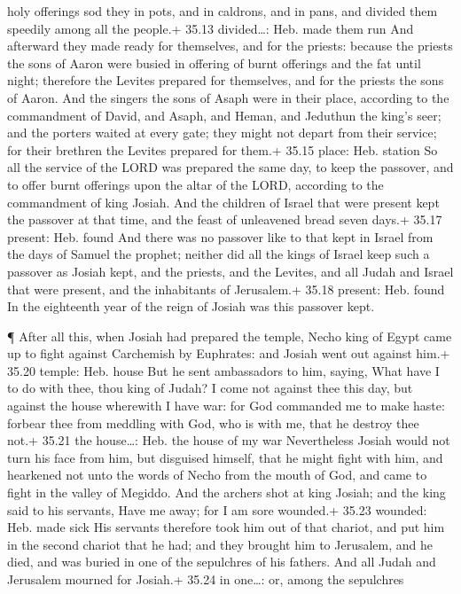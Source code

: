 holy offerings sod they in pots, and in caldrons, and in pans, and
divided them speedily among all the people.+ 35.13 divided\ldots: Heb.
made them run  And afterward they made ready for
themselves, and for the priests: because the priests the sons of Aaron
were busied in offering of burnt offerings and the fat until night;
therefore the Levites prepared for themselves, and for the priests the
sons of Aaron.  And the singers the sons of Asaph were in
their place, according to the commandment of David, and Asaph, and
Heman, and Jeduthun the king's seer; and the porters waited at every
gate; they might not depart from their service; for their brethren the
Levites prepared for them.+ 35.15 place: Heb. station  So
all the service of the LORD was prepared the same day, to keep the
passover, and to offer burnt offerings upon the altar of the LORD,
according to the commandment of king Josiah.  And the
children of Israel that were present kept the passover at that time, and
the feast of unleavened bread seven days.+ 35.17 present: Heb. found
 And there was no passover like to that kept in Israel from
the days of Samuel the prophet; neither did all the kings of Israel keep
such a passover as Josiah kept, and the priests, and the Levites, and
all Judah and Israel that were present, and the inhabitants of
Jerusalem.+ 35.18 present: Heb. found  In the eighteenth
year of the reign of Josiah was this passover kept.

 ¶ After all this, when Josiah had prepared the temple,
Necho king of Egypt came up to fight against Carchemish by Euphrates:
and Josiah went out against him.+ 35.20 temple: Heb. house 
But he sent ambassadors to him, saying, What have I to do with thee,
thou king of Judah? I come not against thee this day, but against the
house wherewith I have war: for God commanded me to make haste: forbear
thee from meddling with God, who is with me, that he destroy thee not.+
35.21 the house\ldots: Heb. the house of my war 
Nevertheless Josiah would not turn his face from him, but disguised
himself, that he might fight with him, and hearkened not unto the words
of Necho from the mouth of God, and came to fight in the valley of
Megiddo.  And the archers shot at king Josiah; and the king
said to his servants, Have me away; for I am sore wounded.+ 35.23
wounded: Heb. made sick  His servants therefore took him
out of that chariot, and put him in the second chariot that he had; and
they brought him to Jerusalem, and he died, and was buried in one of the
sepulchres of his fathers. And all Judah and Jerusalem mourned for
Josiah.+ 35.24 in one\ldots: or, among the sepulchres

